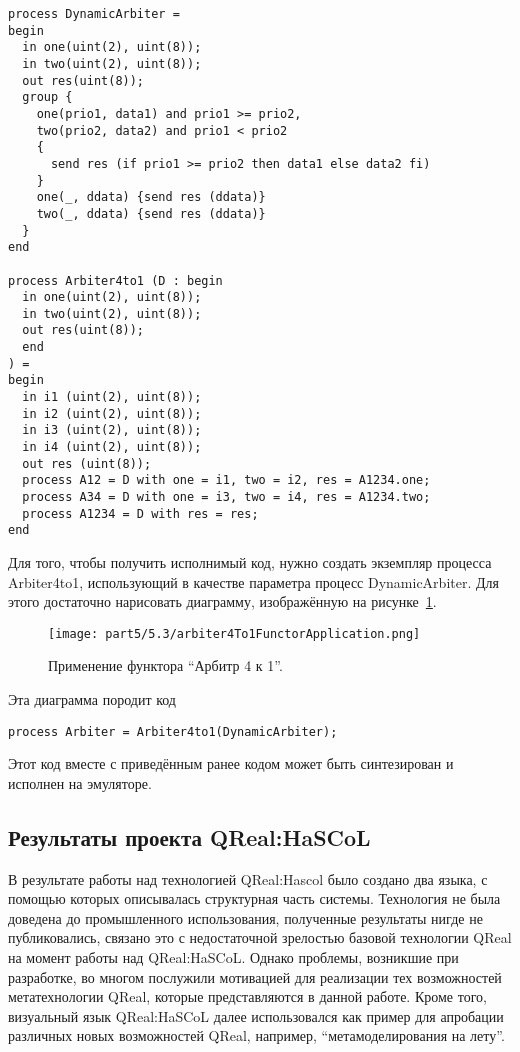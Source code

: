 \vspace{5mm}
\begin{minipage}{\linewidth}
\begin{verbatim}
process DynamicArbiter =
begin
  in one(uint(2), uint(8));
  in two(uint(2), uint(8));
  out res(uint(8));
  group {
    one(prio1, data1) and prio1 >= prio2,
    two(prio2, data2) and prio1 < prio2
    {
      send res (if prio1 >= prio2 then data1 else data2 fi)
    }
    one(_, ddata) {send res (ddata)}
    two(_, ddata) {send res (ddata)}
  }
end

process Arbiter4to1 (D : begin
  in one(uint(2), uint(8));
  in two(uint(2), uint(8));
  out res(uint(8));
  end
) =
begin
  in i1 (uint(2), uint(8));
  in i2 (uint(2), uint(8));
  in i3 (uint(2), uint(8));
  in i4 (uint(2), uint(8));
  out res (uint(8));
  process A12 = D with one = i1, two = i2, res = A1234.one;
  process A34 = D with one = i3, two = i4, res = A1234.two;
  process A1234 = D with res = res;
end
\end{verbatim}
\end{minipage}
\vspace{5mm}

Для того, чтобы получить исполнимый код, нужно создать экземпляр процесса Arbiter4to1, 
использующий в качестве параметра процесс DynamicArbiter. Для этого достаточно нарисовать 
диаграмму, изображённую на рисунке~\ref{image:arbiter4To1FunctorApplication}.

\begin{figure} [ht]
	\begin{center}
		\texttt{[image: part5/5.3/arbiter4To1FunctorApplication.png]}
		\caption{Применение функтора "`Арбитр 4 к 1"'.}
		\label{image:arbiter4To1FunctorApplication}
	\end{center}
\end{figure}

Эта диаграмма породит код 

\begin{verbatim}
process Arbiter = Arbiter4to1(DynamicArbiter);
\end{verbatim}

Этот код вместе с приведённым ранее кодом может быть синтезирован и исполнен на эмуляторе.

\subsection{Результаты проекта QReal:HaSCoL}
В результате работы над технологией QReal:Hascol было создано два языка, с помощью 
которых описывалась структурная часть системы. Технология не была доведена до промышленного 
использования, полученные результаты нигде не публиковались, связано это с недостаточной 
зрелостью базовой технологии QReal на момент работы над QReal:HaSCoL. Однако проблемы, 
возникшие при разработке, во многом послужили мотивацией для реализации тех возможностей 
метатехнологии QReal, которые представляются в данной работе. Кроме того, визуальный язык 
QReal:HaSCoL далее использовался как пример для апробации различных новых возможностей 
QReal, например, "`метамоделирования на лету"'.

